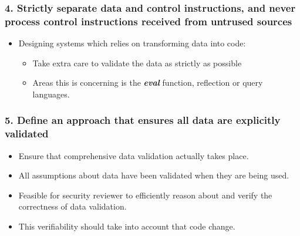 \documentclass[12pt,norsk]{beamer}
\begin{document}
\begin{frame}
	\frametitle{4. Strictly separate data and control instructions, and never process control instructions received from untrused sources}
	\begin{itemize}
	\item Designing systems which relies on transforming data into code:
	\begin{itemize}
		\item Take extra care to validate the data as strictly as possible
		\item Areas this is concerning is the \textit{\textbf{eval}} function, reflection or query languages.
	\end{itemize}
	
	\end{itemize}

\end{frame}

\begin{frame}

	\frametitle{5. Define an approach that ensures all data are explicitly validated}
	
	\begin{itemize}
		\item Ensure that comprehensive data validation actually takes place.
		\item All assumptions about data have been validated when they are being used.
		\item Feasible for security reviewer to efficiently reason about and verify the correctness of data validation.
		\item This verifiability should take into account that code change.
	
	\end{itemize}
	

\end{frame}
\end{document}
